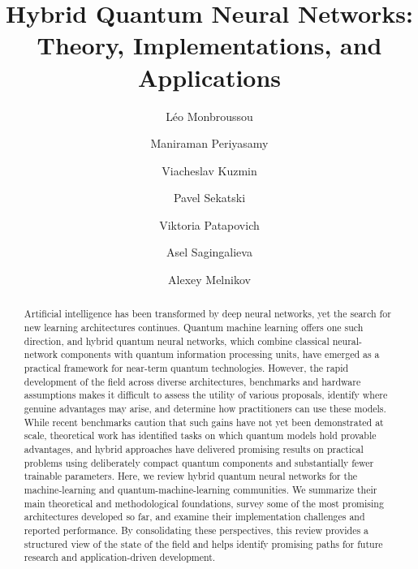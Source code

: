 \documentclass[aps,10pt,groupedaddress,prx,superscriptaddress,twocolumn,balancelastpage, tightenlines]{revtex4-2}
\theoremstyle{plain}  %
\begin{document}
\title{Hybrid Quantum Neural Networks: Theory, Implementations,
and Applications}


\author{Léo Monbroussou}

\author{Maniraman Periyasamy}

\author{Viacheslav Kuzmin}

\author{Pavel Sekatski}

\author{Viktoria Patapovich}

\author{Asel Sagingalieva}

\author{Alexey Melnikov}



\begin{abstract}
    Artificial intelligence has been transformed by deep neural networks, yet the search for new learning architectures continues. Quantum machine learning offers one such direction, and hybrid quantum neural networks, which combine classical neural-network components with quantum information processing units, have emerged as a practical framework for near-term quantum technologies. However, the rapid development of the field across diverse architectures, benchmarks and hardware assumptions makes it difficult to assess the utility of various proposals, identify where genuine advantages may arise, and determine how practitioners can use these models. While recent benchmarks caution that such gains have not yet been demonstrated at scale, theoretical work has identified tasks on which quantum models hold provable advantages, and hybrid approaches have delivered promising results on practical problems using deliberately compact quantum components and substantially fewer trainable parameters. Here, we review hybrid quantum neural networks for the machine-learning and quantum-machine-learning communities. We summarize their main theoretical and methodological foundations, survey some of the most promising architectures developed so far, and examine their implementation challenges and reported performance. By consolidating these perspectives, this review provides a structured view of the state of the field and helps identify promising paths for future research and application-driven development.
\end{abstract}
\end{document}
